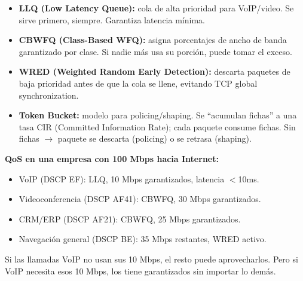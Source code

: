 \begin{center}
\end{center}

\begin{itemize}
    \item \textbf{LLQ (Low Latency Queue):} cola de alta prioridad para VoIP/video.
          Se sirve primero, siempre. Garantiza latencia mínima.
    \item \textbf{CBWFQ (Class-Based WFQ):} asigna porcentajes de ancho de banda
          garantizado por clase. Si nadie más usa su porción, puede tomar el exceso.
    \item \textbf{WRED (Weighted Random Early Detection):} descarta paquetes de baja
          prioridad antes de que la cola se llene, evitando TCP global synchronization.
    \item \textbf{Token Bucket:} modelo para policing/shaping. Se ``acumulan fichas''
          a una tasa CIR (Committed Information Rate); cada paquete consume fichas.
          Sin fichas $\to$ paquete se descarta (policing) o se retrasa (shaping).
\end{itemize}

\begin{ejemplo}
\textbf{QoS en una empresa con 100 Mbps hacia Internet:}
\begin{itemize}
    \item VoIP (DSCP EF): LLQ, 10 Mbps garantizados, latencia $<$10ms.
    \item Videoconferencia (DSCP AF41): CBWFQ, 30 Mbps garantizados.
    \item CRM/ERP (DSCP AF21): CBWFQ, 25 Mbps garantizados.
    \item Navegación general (DSCP BE): 35 Mbps restantes, WRED activo.
\end{itemize}
Si las llamadas VoIP no usan sus 10 Mbps, el resto puede aprovecharlos.
Pero si VoIP necesita esos 10 Mbps, los tiene garantizados sin importar lo demás.
\end{ejemplo}

